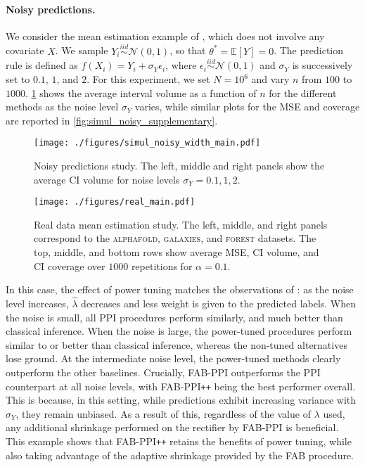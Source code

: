 \paragraph{Noisy predictions.}
We consider the mean estimation example of \citet[\S7.1.1]{Angelopoulos2023a}, which does not involve any covariate $X$.
We sample $Y_i \overset{iid}{\sim} \mathcal{N}(0, 1)$, so that $\theta^* = \mathbb{E}[Y] = 0$.
The prediction rule is defined as $f(X_i) = Y_i + \sigma_Y \epsilon_i$, where $\epsilon_i \overset{iid}{\sim} \mathcal{N}(0,1)$ and $\sigma_Y$ is successively set to $0.1$, $1$, and $2$.
For this experiment, we set $N = 10^6$ and vary $n$ from $100$ to $1000$.
\cref{fig:simul_noisy_width_main} shows the average interval volume as a function of $n$ for the different methods as the noise level $\sigma_Y$ varies, while similar plots for the MSE and coverage are reported in \cref{fig:simul_noisy_supplementary}.
\begin{figure}[ht!]
    \centering
    \texttt{[image: ./figures/simul\_noisy\_width\_main.pdf]}
    \caption{Noisy predictions study. The left, middle and right panels show the average CI volume for noise levels $\sigma_Y = 0.1, 1, 2$.}
    \label{fig:simul_noisy_width_main}
\end{figure}
\begin{figure*}[ht!]
    \centering
    \texttt{[image: ./figures/real\_main.pdf]}
    \caption{Real data mean estimation study. The left, middle, and right panels correspond to the \textsc{alphafold}, \textsc{galaxies}, and \textsc{forest} datasets. The top, middle, and bottom rows show average MSE, CI volume, and CI coverage over $1000$ repetitions for $\alpha = 0.1$.}
    \label{fig:real_main}
\end{figure*}
In this case, the effect of power tuning matches the observations of \citet{Angelopoulos2023a}: as the noise level increases, $\hat{\lambda}$ decreases and less weight is given to the predicted labels.
When the noise is small, all PPI procedures perform similarly, and much better than classical inference.
When the noise is large, the power-tuned procedures perform similar to or better than classical inference, whereas the non-tuned alternatives lose ground.
At the intermediate noise level, the power-tuned methods clearly outperform the other baselines.
Crucially, FAB-PPI outperforms the PPI counterpart at all noise levels, with FAB-PPI\texttt{++} being the best performer overall. This is because, in this setting, while predictions exhibit increasing variance with $\sigma_Y$, they remain unbiased. As a result of this, regardless of the value of $\lambda$ used, any additional shrinkage performed on the rectifier by FAB-PPI is beneficial. This example shows that FAB-PPI\texttt{++} retains the benefits of power tuning, while also taking advantage of the adaptive shrinkage provided by the FAB procedure.

